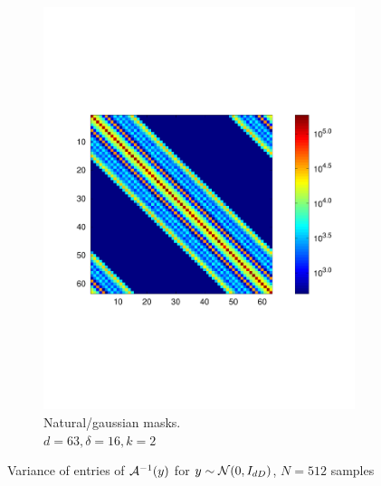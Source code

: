 \begin{figure}
\begin{subfigure}[b]{.49\textwidth}
    \includegraphics[width=\textwidth,trim={.4in 2.5in .8in 2.5in}]{figs/gausvar64}
    \caption{Natural/gaussian masks.\\  $d = 63, \delta = 16, k = 2$}
    \label{fig:gausvar512}
  \end{subfigure}
  \caption{Variance of entries of $\mathcal{A}^{-1}(y)$ for $y \sim \mathcal{N}(0, I_{dD})$, $N = 512$ samples}
  \label{fig:distvar64}    
\end{figure}

